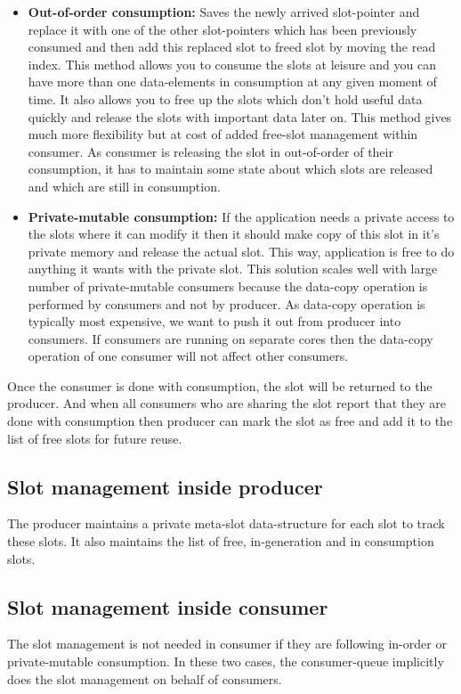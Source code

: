 \documentclass[a4paper,twoside]{report} %
\begin{document}
\begin{enumerate}
\begin{itemize}
    \item \textbf{Out-of-order consumption:} 
    Saves the newly arrived slot-pointer and replace it with one of
    the other slot-pointers which has been previously consumed and then add this
    replaced slot to freed slot by moving the read index.  This method
    allows you to consume the slots at leisure and you can have more
    than one data-elements in consumption at any given moment of time.
    It also allows you to
    free up the slots which don't hold useful data quickly and release
    the slots with important data later on.  This method gives much
    more flexibility but at cost of added free-slot management within
    consumer.  As consumer is releasing the slot in out-of-order of
    their consumption, it has to maintain some state about which slots
    are released and which are still in consumption.

    \item \textbf{Private-mutable consumption:} 
    If the application needs a private access to the slots where it
    can modify it then it should make copy of this slot in it's
    private memory and release the actual slot.  This way, application
    is free to do anything it wants with the private slot.  This
    solution scales well with large number of private-mutable
    consumers because the data-copy operation is performed by
    consumers and not by producer.  As data-copy operation is
    typically most expensive, we want to push it out from producer
    into consumers.  If consumers are running on separate cores then
    the data-copy operation of one consumer will not affect other
    consumers.
  \end{itemize}
  

  Once the consumer is done with consumption, the slot will be
  returned to the producer.  And when all consumers who are sharing
  the slot report that they are done with consumption then producer
  can mark the slot as free and add it to the list of free slots for
  future reuse.
\end{enumerate}

\subsection{Slot management inside producer}
The producer maintains a private meta-slot data-structure for each 
slot to track these slots.  It also maintains the list of free,
in-generation and in consumption slots.

\subsection{Slot management inside consumer}
The slot management is not needed in consumer if they are following
in-order or private-mutable consumption.  In these two cases, the
consumer-queue implicitly does the slot management on behalf of consumers.
\end{document}
